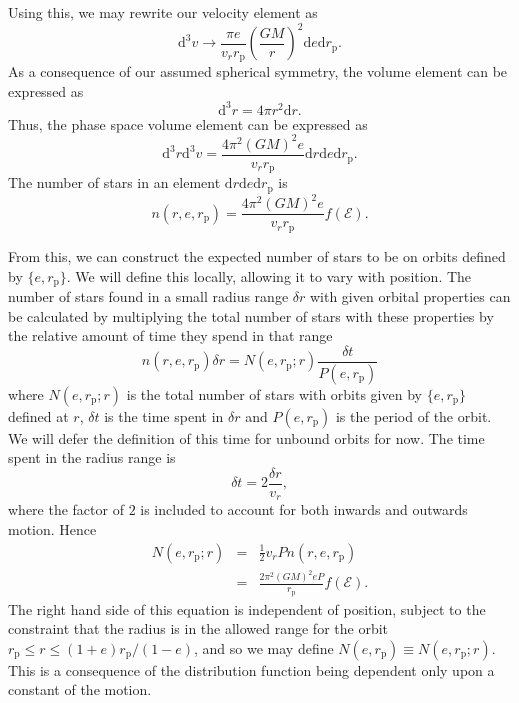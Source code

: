 \documentclass[useAMS,usedcolumn,usegraphicx,usenatbib]{mn2e}
\newcommand{\sub}[1]{\ensuremath{_\mathrm{#1}}}
\newcommand{\dd}{\ensuremath{\mathrm{d}}}
\newcommand{\recip}[1]{\ensuremath{\frac{1}{#1}}}
\begin{document}
Using this, we may rewrite our velocity element as
\begin{equation}
\dd^3v \rightarrow \frac{\pi e}{v_rr\sub{p}}\left(\frac{GM}{r}\right)^2\dd e \dd r\sub{p}.
\end{equation}
As a consequence of our assumed spherical symmetry, the volume element can be expressed as
\begin{equation}
\dd^3r = 4\pi r^2 \dd r.
\end{equation}
Thus, the phase space volume element can be expressed as
\begin{equation}
\dd^3r\dd^3v = \frac{4\pi^2(GM)^2e}{v_rr\sub{p}}\dd r\dd e \dd r\sub{p}.
\end{equation}
The number of stars in an element $\dd r\dd e \dd r\sub{p}$ is
\begin{equation}
n(r, e, r\sub{p}) = \frac{4\pi^2(GM)^2e}{v_rr\sub{p}}f(\mathcal{E}).
\end{equation}

From this, we can construct the expected number of stars to be on orbits defined by $\{e, r\sub{p}\}$. We will define this locally, allowing it to vary with position. The number of stars found in a small radius range $\delta r$ with given orbital properties can be calculated by multiplying the total number of stars with these properties by the relative amount of time they spend in that range
\begin{equation}
n(r, e, r\sub{p})\delta r = N(e, r\sub{p}; r)\frac{\delta t}{P(e, r\sub{p})}
\end{equation}
where $N(e, r\sub{p}; r)$ is the total number of stars with orbits given by $\{e, r\sub{p}\}$ defined at $r$, $\delta t$ is the time spent in $\delta r$ and $P(e, r\sub{p})$ is the period of the orbit. We will defer the definition of this time for unbound orbits for now. The time spent in the radius range is
\begin{equation}
\delta t = 2\frac{\delta r}{v_r},
\end{equation}
where the factor of $2$ is included to account for both inwards and outwards motion. Hence
\begin{eqnarray}
N(e, r\sub{p}; r) &=& \recip{2} v_r P n(r, e, r\sub{p})\\
 &=& \frac{2\pi^2(GM)^2 e P}{r\sub{p}}f(\mathcal{E}).
\end{eqnarray}
The right hand side of this equation is independent of position, subject to the constraint that the radius is in the allowed range for the orbit $r\sub{p} \leq r \leq (1+e)r\sub{p}/(1-e)$, and so we may define $N(e, r\sub{p}) \equiv N(e, r\sub{p}; r)$. This is a consequence of the distribution function being dependent only upon a constant of the motion.
\end{document}
